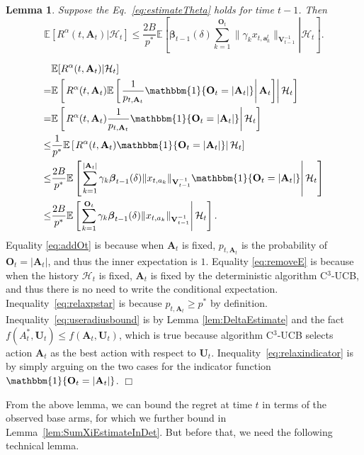 \documentclass{article}
\newcommand{\bbeta}{\boldsymbol{\beta}}
\newcommand{\EE}{\mathbb{E}}
\newcommand{\bOne}{\mathbbm{1}}
\newcommand{\bA}{\mathbf{A}}
\newcommand{\ba}{\mathbf{a}}
\newcommand{\bO}{\mathbf{O}}
\newcommand{\bU}{\mathbf{U}}
\newcommand{\bV}{\mathbf{V}}
\newcommand{\cH}{\mathcal{H}}
\newcommand{\abs}[1]{\left| #1 \right|}
\newcommand{\norm}[1]{\| #1 \|}
\newtheorem{lemma}[theorem]{Lemma}%
\newenvironment{proof}{\noindent {\textbf{Proof. }}}{$\Box$ \medskip}
\begin{document}
\begin{lemma} %
	\label{lem:DeltaEsimateWithP*}
	Suppose the Eq.~\eqref{eq:estimateTheta} holds for time $t-1$. Then
	$$
	\EE[R^{\alpha}(t, \bA_t) | \cH_t] \leq \frac{2B}{p^*} \EE \left[ \left.\bbeta_{t-1}(\delta) \sum_{k=1}^{\bO_t}\norm{\gamma_k x_{t,\ba_k^t}}_{\bV_{t-1}^{-1}} \right| \cH_t \right].
	$$
\end{lemma}
\begin{proof}
	\begin{align}
		&\EE[R^{\alpha}(t, \bA_t)|\cH_t]  \nonumber \\
		=& \EE \left[ \left. R^{\alpha}(t, \bA_t) \EE \left[ \left. \frac{1}{p_{t, \bA_t}} \bOne\{\bO_t = \abs{\bA_t}\} \right| \bA_t \right]  \right| \cH_t \right] \label{eq:addOt}\\
		=& \EE \left[ \left. R^{\alpha}(t, \bA_t) \frac{1}{p_{t, \bA_t}} \bOne\{\bO_t = \abs{\bA_t}\}  \right| \cH_t \right] \label{eq:removeE}\\
		\leq &\frac{1}{p^{\ast}} \EE \left[ \left. R^{\alpha}(t, \bA_t) \bOne\{\bO_t = \abs{\bA_t}\}  \right| \cH_t \right] \label{eq:relaxpstar}\\
		\leq &\frac{2B}{p^{\ast}} \EE \left[ \left. \sum_{k=1}^{\abs{\bA_t}} \gamma_k \bbeta_{t-1}(\delta)\norm{x_{t,a_k}}_{\bV_{t-1}^{-1}} \bOne\{\bO_t = \abs{\bA_t}\}  \right| \cH_t \right] \label{eq:useradiusbound}\\
		\leq &\frac{2B}{p^{\ast}} \EE \left[ \left. \sum_{k=1}^{\bO_t} \gamma_k \bbeta_{t-1}(\delta)\norm{x_{t,a_k}}_{\bV_{t-1}^{-1}} \right| \cH_t \right]. \label{eq:relaxindicator}
	\end{align}
	Equality \eqref{eq:addOt} is because when $\bA_t$ is fixed, $p_{t, \bA_t}$ is the probability of $\bO_t = \abs{\bA_t}$, and thus the inner expectation is $1$. Equality \eqref{eq:removeE} is because when the history $\cH_t$ is fixed, $\bA_t$ is fixed by the deterministic algorithm C$^3$-UCB, and thus there is no need to write the conditional expectation. Inequality~\eqref{eq:relaxpstar} is because $p_{t,\bA_t} \geq p^*$ by definition. Inequality~\eqref{eq:useradiusbound} is by Lemma \ref{lem:DeltaEstimate} and the fact $f(A_t^*, \bU_t) \leq f(\bA_t, \bU_t)$, which is true because algorithm C$^3$-UCB selects action $\bA_t$ as the best action with respect to $\bU_t$. Inequality~\eqref{eq:relaxindicator} is by simply arguing on the two cases for the indicator function $\bOne\{\bO_t = \abs{\bA_t}\}$.
\end{proof}

From the above lemma, we can bound the regret at time $t$ in terms of the observed base arms, for which we further bound in Lemma~\ref{lem:SumXiEstimateInDet}.
But before that, we need the following technical lemma.
\end{document}
